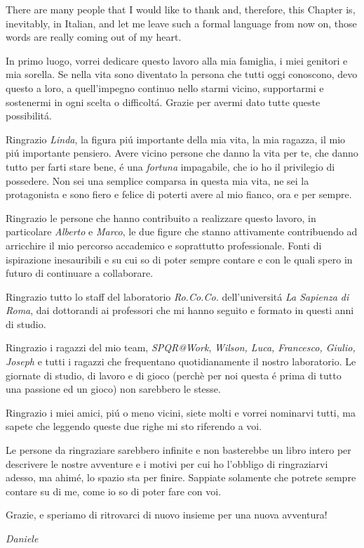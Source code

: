 \newpage

\begin{acknowledgements}
There are many people that I would like to thank and, therefore, this Chapter is, inevitably, in Italian, and let me leave such a formal language from now on, those words are really coming out of my heart.

In primo luogo, vorrei dedicare questo lavoro alla mia famiglia, i miei genitori e mia sorella. Se nella vita sono diventato la persona che tutti oggi conoscono, devo questo a loro, a quell'impegno continuo nello starmi vicino, supportarmi e sostenermi in ogni scelta o difficolt\'a. Grazie per avermi dato tutte queste possibilit\'a.

Ringrazio \emph{Linda}, la figura pi\'u importante della mia vita, la mia ragazza, il mio pi\'u importante pensiero. Avere vicino persone che danno la vita per te, che danno tutto per farti stare bene, \'e una \emph{fortuna} impagabile, che io ho il privilegio di possedere. Non sei una semplice comparsa in questa mia vita, ne sei la protagonista e sono fiero e felice di poterti avere al mio fianco, ora e per sempre.

Ringrazio le persone che hanno contribuito a realizzare questo lavoro, in particolare \emph{Alberto} e \emph{Marco}, le due figure che stanno attivamente contribuendo ad arricchire il mio percorso accademico e soprattutto professionale. Fonti di ispirazione inesauribili e su cui so di poter sempre contare e con le quali spero in futuro di continuare a collaborare.

Ringrazio tutto lo staff del laboratorio \emph{Ro.Co.Co.} dell'universit\'a \emph{La Sapienza di Roma}, dai dottorandi ai professori che mi hanno seguito e formato in questi anni di studio.

Ringrazio i ragazzi del mio team, \emph{SPQR@Work}, \emph{Wilson, Luca, Francesco, Giulio, Joseph} e tutti i ragazzi che frequentano quotidianamente il nostro laboratorio. Le giornate di studio, di lavoro e di gioco (perchè per noi questa \'e prima di tutto una passione ed un gioco) non sarebbero le stesse.

Ringrazio i miei amici, pi\'u o meno vicini, siete molti e vorrei nominarvi tutti, ma sapete che leggendo queste due righe mi sto riferendo a voi.

Le persone da ringraziare sarebbero infinite e non basterebbe un libro intero per descrivere le nostre avventure e i motivi per cui ho l'obbligo di ringraziarvi adesso, ma ahim\'e, lo spazio sta per finire. Sappiate solamente che potrete sempre contare su di me, come io so di poter fare con voi.

Grazie, e speriamo di ritrovarci di nuovo insieme per una nuova avventura!

\emph{Daniele}
\end{acknowledgements}